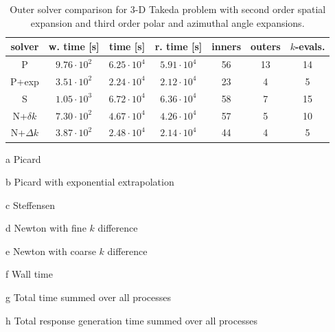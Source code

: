 \begin{table}[ht] 
 \begin{center} 
 
  \begin{threeparttable}
 \begin{tabular}{ccccccc} 
 \toprule 
  solver & w. time\tnote{f} [s]& time\tnote{g} [s] & r. time\tnote{h} [s] & inners & outers & $k$-evals. \\
  \midrule
    P\tnote{a}            &  $9.76\cdot 10^2$ &  $6.25\cdot 10^4$ &  $5.91\cdot 10^4$ &           56 &           13 &           14 \\ 
    P+exp\tnote{b}       &  $3.51\cdot 10^2$ &  $2.24\cdot 10^4$ &  $2.12\cdot 10^4$ &           23 &        4 &   5  \\ 
    S\tnote{c}            &  $1.05\cdot 10^3$ &  $6.72\cdot 10^4$ &  $6.36\cdot 10^4$ &           58 &            7 &           15 \\ 
    N+$\delta k$\tnote{d}&  $7.30\cdot 10^2$ &  $4.67\cdot 10^4$ &  $4.26\cdot 10^4$ &           57 &            5 &           10 \\ 
    N+$\Delta k$\tnote{e}&  $3.87\cdot 10^2$ &  $2.48\cdot 10^4$ &  $2.14\cdot 10^4$ &           44 &          4 &           5  \\ 
 \bottomrule 
 \end{tabular} 
 
 
 {\footnotesize
 \begin{tablenotes}
   \item[a] Picard 
   \item[b] Picard with exponential extrapolation
   \item[c] Steffensen
   \item[d] Newton with fine $k$ difference
   \item[e] Newton with coarse $k$ difference
   \item[f] Wall time
   \item[g] Total time summed over all processes
   \item[h] Total response generation time summed over all processes
 \end{tablenotes}
 }
 
 \end{threeparttable}
 
 \end{center} 
 \caption{Outer solver comparison for 3-D Takeda problem with second order 
          spatial expansion and third order polar and azimuthal angle 
          expansions.} 
 \label{tbl:takeda_outer_study} 
\end{table} 

